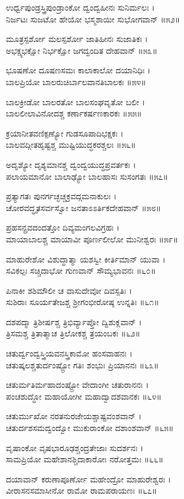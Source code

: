 ಉರ್ಧ್ವಪುಂಡ್ರಸ್ತ್ರಿಪುಂಡ್ರಾಂಕೋ ದ್ವಂದ್ವಹೀನಃ ಸುನಿರ್ಮಲಃ ।\\
ನಿರ್ಜಟಃ ಸುಜಟೋ ಹೇಯೋ ಭಸ್ಮಶಾಯೀ ಸುಭೋಗವಾನ್ ॥೫೨॥

ಮೂತ್ರಸ್ಪರ್ಶೋ ಮಲಸ್ಪರ್ಶೋ ಜಾತಿಹೀನಃ ಸುಜಾತಿಕಃ ।\\
ಅಭಕ್ಷ್ಯಭಕ್ಷೋ ನಿರ್ಭಕ್ಷೋ ಜಗದ್ವಂದಿತ ದೇಹವಾನ್ ॥೫೩॥

ಭೂಷಣೋ ದೂಷಣಸಮಃ ಕಾಲಾಕಾಲೋ ದಯಾನಿಧಿಃ ।\\
ಬಾಲಪ್ರಿಯೋ ಬಾಲರುಚಿರ್ಬಾಲವಾನತಿಬಾಲಕಃ ॥೫೪॥

ಬಾಲಕ್ರೀಡೋ ಬಾಲರತೋ ಬಾಲಸಂಘವೃತೋ ಬಲೀ ।\\
ಬಾಲಲೀಲಾವಿನೋದಶ್ಚ ಕರ್ಣಾಕರ್ಷಣಕಾರಕಃ ॥೫೫॥

ಕ್ರಯಾನೀತವಣಿಕ್ಪಣ್ಯೋ ಗುಡಸೂಪಾದಿಭಕ್ಷಕಃ ।\\
ಬಾಲವದ್ಗೀತಹೃಷ್ಟಶ್ಚ ಮುಷ್ಟಿಯುದ್ಧಕರಶ್ಚಲಃ ॥೫೬॥

ಅದೃಶ್ಯೋ ದೃಶ್ಯಮಾನಶ್ಚ ದ್ವಂದ್ವಯುದ್ಧಪ್ರವರ್ತಕಃ ।\\
ಪಲಾಯಮಾನೋ ಬಾಲಾಢ್ಯೋ ಬಾಲಹಾಸಃ ಸುಸಂಗತಃ ॥೫೭॥

ಪ್ರತ್ಯಾಗತಃ ಪುನರ್ಗಚ್ಛಚ್ಚಕ್ರವದ್ಗಮನಾಕುಲಃ ।\\
ಚೋರವದ್ಧೃತಸರ್ವಸ್ವೋ ಜನತಾಽಽರ್ತಿಕದೇಹವಾನ್ ॥೫೮॥

ಪ್ರಹಸನ್ಪ್ರವದಂದತ್ತೋ ದಿವ್ಯಮಂಗಲವಿಗ್ರಹಃ ।\\
ಮಾಯಾಬಾಲಶ್ಚ ಮಾಯಾವೀ ಪೂರ್ಣಲೀಲೋ ಮುನೀಶ್ವರಃ ॥೫೯॥

ಮಾಹುರೇಶೋ ವಿಶುದ್ಧಾತ್ಮಾ ಯಶಸ್ವೀ ಕೀರ್ತಿಮಾನ್ ಯುವಾ ।\\
ಸವಿಕಲ್ಪಃ ಸಚ್ಚಿದಾಭೋ ಗುಣವಾನ್ ಸೌಮ್ಯಭಾವನಃ ॥೬೦॥

ಪಿನಾಕೀ ಶಶಿಮೌಲೀ ಚ ವಾಸುದೇವೋ ದಿವಸ್ಪತಿಃ ।\\
ಸುಶಿರಾಃ ಸೂರ್ಯತೇಜಶ್ಚ ಶ್ರೀಗಂಭೀರೋಷ್ಠ ಉನ್ನತಿಃ ॥೬೧॥

ದಶಪದ್ಮಾ ತ್ರಿಶೀರ್ಷಶ್ಚ ತ್ರಿಭಿರ್ವ್ಯಾಪ್ತೋ ದ್ವಿಶುಕ್ಲವಾನ್ ।\\
ತ್ರಿಸಮಶ್ಚ ತ್ರಿತಾತ್ಮಾಚ ತ್ರಿಲೋಕಶ್ಚ ತ್ರಯಂಬಕಃ ॥೬೨॥

ಚತುರ್ದ್ವಂದ್ವಸ್ತ್ರಿಯವನಸ್ತ್ರಿಕಾಮೋ ಹಂಸವಾಹನಃ ।\\
ಚತುಷ್ಕಲಶ್ಚತುರ್ದಂಷ್ಟ್ರೋ ಗತಿಃ ಶಂಭುಃ ಪ್ರಿಯಾನನಃ ॥೬೩॥

ಚತುರ್ಮತಿರ್ಮಹಾದಂಷ್ಟ್ರೋ ವೇದಾಂಗೀ ಚತುರಾನನಃ ।\\
ಪಂಚಶುದ್ಧೋ ಮಹಾಯೋಗೀ ಮಹಾದ್ವಾದಶವಾನಕಃ ॥೬೪॥

ಚತುರ್ಮುಖೋ ನರತನುರಜೇಯಶ್ಚಾಷ್ಟವಂಶವಾನ್ ।\\
ಚತುರ್ದಶಸಮದ್ವಂದ್ವೋ ಮುಕುರಾಂಕೋ ದಶಾಂಶವಾನ್ ॥೬೫॥

ವೃಷಾಂಕೋ ವೃಷಭಾರೂಢಶ್ಚಂದ್ರತೇಜಾಃ ಸುದರ್ಶನಃ ।\\
ಸಾಮಪ್ರಿಯೋ ಮಹೇಶಾನಶ್ಚಿದಾಕಾರೋಃ ನರೋತ್ತಮಃ ॥೬೬॥

ದಯಾವಾನ್ ಕರುಣಾಪೂರ್ಣೋ ಮಹೇಂದ್ರೋ ಮಾಹುರೇಶ್ವರಃ ।\\
ವೀರಾಸನಸಮಾಸೀನೋ ರಾಮೋ ರಾಮಪರಾಯಣಃ ॥೬೭॥

